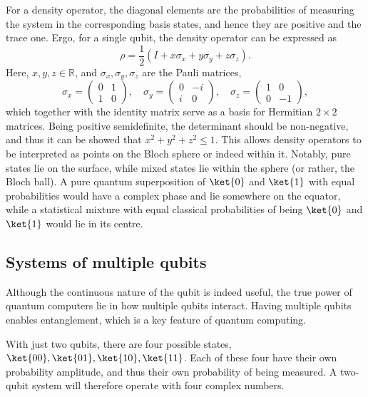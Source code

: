 For a density operator, the diagonal elements are the probabilities of measuring the system in the corresponding basis states, and hence they are positive and the trace one.
Ergo, for a single qubit, the density operator can be expressed as
\begin{equation}
    \rho = \frac{1}{2} \left(I + x \sigma_x + y \sigma_y + z \sigma_z\right).
\end{equation}
Here, $x, y, z \in \mathbb{R}$, and $\sigma_x, \sigma_y, \sigma_z$ are the Pauli matrices,
\begin{equation}
    \sigma_x = \begin{pmatrix} 0 & 1 \\ 1 & 0 \end{pmatrix}, \quad
    \sigma_y = \begin{pmatrix} 0 & -i \\ i & 0 \end{pmatrix}, \quad
    \sigma_z = \begin{pmatrix} 1 & 0 \\ 0 & -1 \end{pmatrix},
    \label{eq:pauli}
\end{equation}
which together with the identity matrix serve as a basis for Hermitian $2\times 2$ matrices.
Being positive semidefinite, the determinant should be non-negative, and thus it can be showed that $x^2 + y^2 + z^2 \leq 1$.
This allows density operators to be interpreted as points on the Bloch sphere or indeed within it.
Notably, pure states lie on the surface, while mixed states lie within the sphere (or rather, the Bloch ball).
A pure quantum superposition of $\ket{0}$ and $\ket{1}$ with equal probabilities would have a complex phase and lie somewhere on the equator, while a statistical mixture with equal classical probabilities of being $\ket{0}$ and $\ket{1}$ would lie in its centre.

\subsection{Systems of multiple qubits}
Although the continuous nature of the qubit is indeed useful, the true power of quantum computers lie in how multiple qubits interact.
Having multiple qubits enables entanglement, which is a key feature of quantum computing.

With just two qubits, there are four possible states, $\ket{00}, \ket{01}, \ket{10}, \ket{11}$.
Each of these four have their own probability amplitude, and thus their own probability of being measured.
A two-qubit system will therefore operate with four complex numbers.

